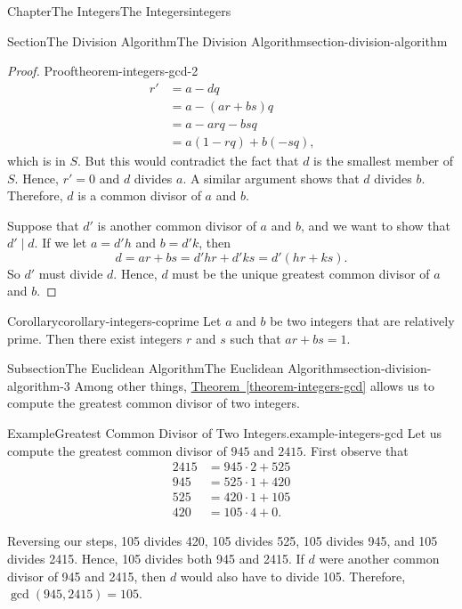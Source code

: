 \documentclass[oneside,10pt,]{book}
\newcommand{\xreffont}{\relax}
\numberwithin{equation}{section}
\begin{document}
\begin{chapterptx}{Chapter}{The Integers}{}{The Integers}{}{}{integers}
\begin{sectionptx}{Section}{The Division Algorithm}{}{The Division Algorithm}{}{}{section-division-algorithm}
\begin{introduction}{}
\begin{proof}{Proof}{}{theorem-integers-gcd-2}
\begin{align*}
r'& = a - dq\\
& = a - (ar + bs)q\\
& = a - arq - bsq\\
& = a( 1 - rq ) + b( -sq )\text{,}
\end{align*}
which is in \(S\).  But this would contradict the fact that \(d\) is the smallest member of \(S\).  Hence, \(r' = 0\) and \(d\) divides \(a\).  A similar argument shows that \(d\) divides \(b\).  Therefore, \(d\) is a common divisor of \(a\) and \(b\).%
\par
Suppose that \(d'\) is another common divisor of \(a\) and \(b\), and we want to show that \(d' \mid d\). If we let \(a = d'h\) and \(b = d'k\), then%
\begin{equation*}
d = ar + bs = d'hr + d'ks = d'(hr + ks)\text{.}
\end{equation*}
So \(d'\) must divide \(d\). Hence, \(d\) must be the unique greatest common divisor of \(a\) and \(b\).%
\end{proof}
\begin{corollary}{Corollary}{}{}{corollary-integers-coprime}%
Let \(a\) and \(b\) be two integers that are relatively prime. Then there exist  integers \(r\) and \(s\) such that \(ar + bs = 1\).%
\end{corollary}
\end{introduction}%
%
%
\typeout{************************************************}
\typeout{************************************************}
%
\begin{subsectionptx}{Subsection}{The Euclidean Algorithm}{}{The Euclidean Algorithm}{}{}{section-division-algorithm-3}
Among other things, \hyperref[theorem-integers-gcd]{Theorem~{\xreffont\ref{theorem-integers-gcd}}} allows us to compute the greatest common divisor of two integers.%
\begin{example}{Example}{Greatest Common Divisor of Two Integers.}{example-integers-gcd}%
Let us compute the greatest common divisor of \(945\) and \(2415\).  First observe that%
\begin{align*}
2415 & = 945 \cdot 2 + 525\\
945 & = 525 \cdot 1 + 420\\
525 & = 420 \cdot 1 + 105\\
420 & = 105 \cdot 4 + 0\text{.}
\end{align*}
%
\par
Reversing our steps, 105 divides 420, 105 divides 525, 105 divides 945, and 105 divides 2415.  Hence, 105 divides both 945 and 2415.  If \(d\) were another common divisor of 945 and 2415, then \(d\) would also have to divide 105.  Therefore, \(\gcd( 945, 2415 ) = 105\).%

\end{example}
\end{subsectionptx}
\end{sectionptx}
\end{chapterptx}
\end{document}
